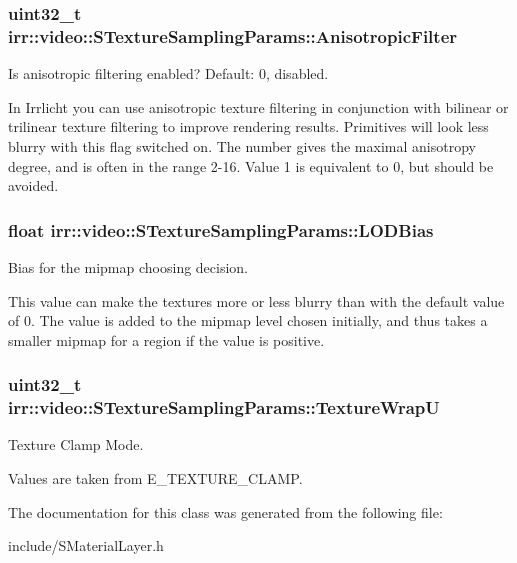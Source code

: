 \subsubsection[{\texorpdfstring{Anisotropic\+Filter}{AnisotropicFilter}}]{\setlength{\rightskip}{0pt plus 5cm}uint32\+\_\+t irr\+::video\+::\+S\+Texture\+Sampling\+Params\+::\+Anisotropic\+Filter}\hypertarget{classirr_1_1video_1_1STextureSamplingParams_afade72ccc4119dd793f918a19739c087}{}\label{classirr_1_1video_1_1STextureSamplingParams_afade72ccc4119dd793f918a19739c087}


Is anisotropic filtering enabled? Default\+: 0, disabled. 

In Irrlicht you can use anisotropic texture filtering in conjunction with bilinear or trilinear texture filtering to improve rendering results. Primitives will look less blurry with this flag switched on. The number gives the maximal anisotropy degree, and is often in the range 2-\/16. Value 1 is equivalent to 0, but should be avoided. 
\subsubsection[{\texorpdfstring{L\+O\+D\+Bias}{LODBias}}]{\setlength{\rightskip}{0pt plus 5cm}float irr\+::video\+::\+S\+Texture\+Sampling\+Params\+::\+L\+O\+D\+Bias}\hypertarget{classirr_1_1video_1_1STextureSamplingParams_a827a14535af4128fc677df4786e11070}{}\label{classirr_1_1video_1_1STextureSamplingParams_a827a14535af4128fc677df4786e11070}


Bias for the mipmap choosing decision. 

This value can make the textures more or less blurry than with the default value of 0. The value is added to the mipmap level chosen initially, and thus takes a smaller mipmap for a region if the value is positive. 
\subsubsection[{\texorpdfstring{Texture\+WrapU}{TextureWrapU}}]{\setlength{\rightskip}{0pt plus 5cm}uint32\+\_\+t irr\+::video\+::\+S\+Texture\+Sampling\+Params\+::\+Texture\+WrapU}\hypertarget{classirr_1_1video_1_1STextureSamplingParams_a3f40347e8e6a496211e908dd41704a1d}{}\label{classirr_1_1video_1_1STextureSamplingParams_a3f40347e8e6a496211e908dd41704a1d}


Texture Clamp Mode. 

Values are taken from E\+\_\+\+T\+E\+X\+T\+U\+R\+E\+\_\+\+C\+L\+A\+MP. 

The documentation for this class was generated from the following file\+:\begin{DoxyCompactItemize}
\item 
include/S\+Material\+Layer.\+h\end{DoxyCompactItemize}
